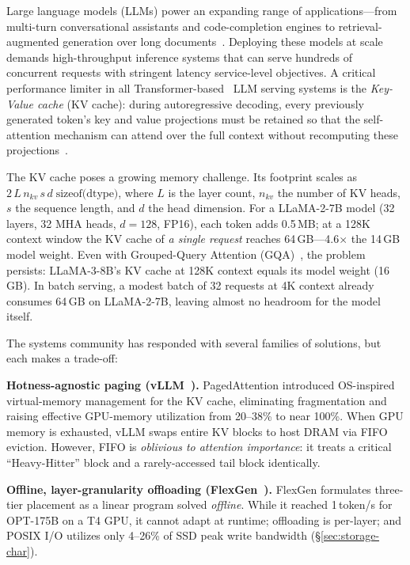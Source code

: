 \documentclass[conference]{IEEEtran}
\begin{document}
Large language models (LLMs) power an expanding range of applications---from multi-turn conversational assistants and code-completion engines to retrieval-augmented generation over long documents~\cite{llama2,llama3}. Deploying these models at scale demands high-throughput inference systems that can serve hundreds of concurrent requests with stringent latency service-level objectives. A critical performance limiter in all Transformer-based~\cite{transformer} LLM serving systems is the \emph{Key-Value cache} (KV cache): during autoregressive decoding, every previously generated token's key and value projections must be retained so that the self-attention mechanism can attend over the full context without recomputing these projections~\cite{vllm}.

The KV cache poses a growing memory challenge. Its footprint scales as $2\,L\,n_{kv}\,s\,d\;\text{sizeof(dtype)}$, where $L$ is the layer count, $n_{kv}$ the number of KV heads, $s$ the sequence length, and $d$ the head dimension. For a LLaMA-2-7B model (32 layers, 32 MHA heads, $d{=}128$, FP16), each token adds 0.5\,MB; at a 128K context window the KV cache of \emph{a single request} reaches 64\,GB---4.6$\times$ the 14\,GB model weight. Even with Grouped-Query Attention (GQA)~\cite{gqa}, the problem persists: LLaMA-3-8B's KV cache at 128K context equals its model weight (16\,GB). In batch serving, a modest batch of 32 requests at 4K context already consumes 64\,GB on LLaMA-2-7B, leaving almost no headroom for the model itself.


The systems community has responded with several families of solutions, but each makes a trade-off:

\textbf{Hotness-agnostic paging (vLLM~\cite{vllm}).} PagedAttention introduced OS-inspired virtual-memory management for the KV cache, eliminating fragmentation and raising effective GPU-memory utilization from 20--38\% to near 100\%. When GPU memory is exhausted, vLLM swaps entire KV blocks to host DRAM via FIFO eviction. However, FIFO is \emph{oblivious to attention importance}: it treats a critical ``Heavy-Hitter'' block and a rarely-accessed tail block identically.

\textbf{Offline, layer-granularity offloading (FlexGen~\cite{flexgen}).} FlexGen formulates three-tier placement as a linear program solved \emph{offline}. While it reached 1\,token/s for OPT-175B on a T4 GPU, it cannot adapt at runtime; offloading is per-layer; and POSIX I/O utilizes only 4--26\% of SSD peak write bandwidth (\S\ref{sec:storage-char}).
\end{document}
